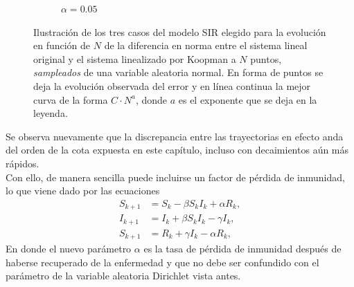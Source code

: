 \begin{figure}[h]
\begin{subfigure}[b]{0.32\textwidth}
        \caption{$\alpha=0.05$}
    \end{subfigure}
    \caption{Ilustración de los tres casos del modelo SIR elegido para la evolución en función de $N$ de la diferencia en norma entre el sistema lineal original y el sistema linealizado por Koopman a $N$ puntos,  \textit{sampleados} de una variable aleatoria normal. En forma de puntos se deja la evolución observada del error y en línea continua la mejor curva de la forma $C \cdot N^{a}$, donde $a$ es el exponente que se deja en la leyenda.}
    \label{fig:ErrorSIR}
\end{figure}
Se observa nuevamente que la discrepancia entre las trayectorias en efecto anda del orden de la cota expuesta en este capítulo, incluso con decaimientos aún más rápidos.\\
Con ello, de manera sencilla puede incluirse un factor de pérdida de inmunidad, lo que viene dado por las ecuaciones
\begin{equation}
    \begin{aligned}
    S_{k+1} &= S_k -\beta S_k I_k + \alpha R_k, \\
    I_{k+1} &= I_k + \beta S_k I_k - \gamma I_k, \\
    S_{k+1} &= R_k + \gamma I_k - \alpha R_k,
    \end{aligned}
    \label{eq:SIR_rec}
\end{equation}
En donde el nuevo parámetro $\alpha$ es la tasa de pérdida de inmunidad después de haberse recuperado de la enfermedad y que no debe ser confundido con el parámetro de la variable aleatoria Dirichlet vista antes.
